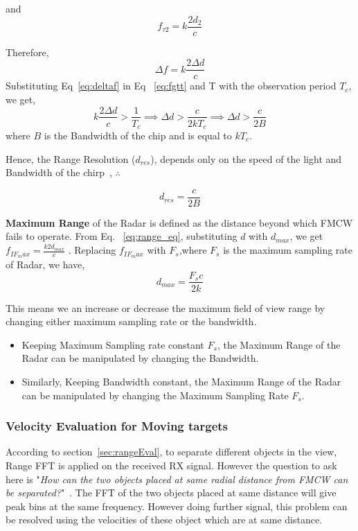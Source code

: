  and
  \begin{equation}
   f_{\tau2}= k\frac{2d_{2}}{c}
 \end{equation} 
 
 Therefore, 
 \begin{equation}\label{eq:deltaf}
     \Delta f = k\frac{2\Delta d}{c}
 \end{equation}
Substituting Eq~\ref{eq:deltaf} in Eq ~\ref{eq:fgtt} and T with the observation period $T_{c}$, we get,
\begin{equation}
  k\frac{2\Delta d}{c} > \frac{1}{T_{c}}  \implies \Delta d > \frac{c}{2kT_{c}} \implies \Delta d > \frac{c}{2B}  
\end{equation}
where $B$ is the Bandwidth of the chip and is equal to $kT_{c}$.

Hence, the Range Resolution ($d_{res}$), depends only on the speed of the light and Bandwidth of the chirp~\cite{rao_2017}, $\therefore$ 

\begin{equation}
   d_{res} = \frac{c}{2B} 
\end{equation}

\textbf{Maximum Range} of the Radar is defined as the distance beyond which FMCW fails to operate. From Eq. ~\ref{eq:range_eq}, substituting $d$ with $d_{max}$, we get \(f_{IF_max} = \frac{k2d_{max}}{c}\) . Replacing $f_{IF_max}$ with $F_{s}$,where $F_{s}$ is the maximum sampling rate of Radar, we have,
\begin{equation}
    d_{max}= \frac{F_{s}c}{2k}
\end{equation}

This means we an increase or decrease the maximum field of view range by changing either maximum sampling rate or the bandwidth.
\begin{itemize}
    \item Keeping Maximum Sampling rate constant $F_{s}$, the Maximum Range of the Radar can be manipulated by changing the Bandwidth.
    \item Similarly,  Keeping Bandwidth constant, the Maximum Range of the Radar can be manipulated by changing the Maximum Sampling Rate $F_{s}$.
\end{itemize}



\subsubsection{Velocity Evaluation for Moving targets}
According to section~\ref{sec:rangeEval}, to separate different objects in the view, Range FFT is applied on the received RX signal. However the question to ask here is "\textit{How can the two objects placed at same radial distance from FMCW can be separated?}"~\cite{rao_2017}. The FFT of the two objects placed at same distance will give peak bins at the same frequency. However doing further signal, this problem can be resolved using the velocities of these object which are at same distance.

